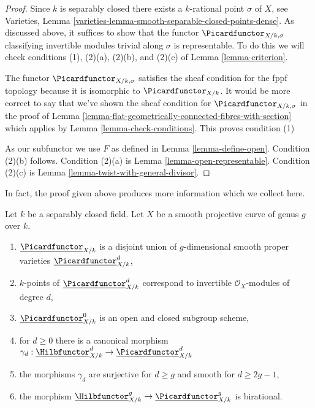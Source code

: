 \begin{proof}
Since $k$ is separably closed there exists a $k$-rational point $\sigma$
of $X$, see
Varieties, Lemma \ref{varieties-lemma-smooth-separable-closed-points-dense}.
As discussed above, it suffices to show that the functor
$\Picardfunctor_{X/k, \sigma}$ classifying invertible modules trivial along
$\sigma$ is representable. To do this we will check conditions (1),
(2)(a), (2)(b), and (2)(c) of
Lemma \ref{lemma-criterion}.

\medskip\noindent
The functor $\Picardfunctor_{X/k, \sigma}$ satisfies the sheaf condition
for the fppf topology because it is isomorphic to $\Picardfunctor_{X/k}$.
It would be more correct to say that we've shown the sheaf condition
for $\Picardfunctor_{X/k, \sigma}$ in the proof of
Lemma \ref{lemma-flat-geometrically-connected-fibres-with-section}
which applies by Lemma \ref{lemma-check-conditions}.
This proves condition (1)

\medskip\noindent
As our subfunctor we use $F$ as defined in Lemma \ref{lemma-define-open}.
Condition (2)(b) follows.
Condition (2)(a) is Lemma \ref{lemma-open-representable}.
Condition (2)(c) is Lemma \ref{lemma-twist-with-general-divisor}.
\end{proof}

\noindent
In fact, the proof given above produces more information which we
collect here.

\begin{lemma}
\label{lemma-picard-pieces}
Let $k$ be a separably closed field. Let $X$ be a smooth projective
curve of genus $g$ over $k$.
\begin{enumerate}
\item $\underline{\Picardfunctor}_{X/k}$ is a disjoint union of
$g$-dimensional smooth proper varieties $\underline{\Picardfunctor}^d_{X/k}$,
\item $k$-points of $\underline{\Picardfunctor}^d_{X/k}$
correspond to invertible $\mathcal{O}_X$-modules of degree $d$,
\item $\underline{\Picardfunctor}^0_{X/k}$
is an open and closed subgroup scheme,
\item for $d \geq 0$ there is a canonical morphism
$\gamma_d :
\underline{\Hilbfunctor}^d_{X/k} \to \underline{\Picardfunctor}^d_{X/k}$
\item the morphisms $\gamma_d$
are surjective for $d \geq g$ and smooth for $d \geq 2g - 1$,
\item the morphism
$\underline{\Hilbfunctor}^g_{X/k} \to \underline{\Picardfunctor}^g_{X/k}$
is birational.
\end{enumerate}
\end{lemma}


